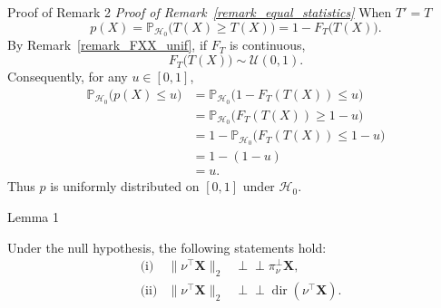 \documentclass{beamer}
\newcommand{\projnu}{\pi_{\nu}^{\perp}}
\newcommand{\indep}{\perp \!\!\! \perp}
\begin{document}
\begin{frame}{Proof of Remark 2}
  \textit{Proof of Remark~\ref{remark_equal_statistics}}
    When \(T'=T\)
    \begin{equation*}
      p(X) = \mathbb{P}_{\mathcal{H}_0}\bigl(T(X) \ge T(X)\bigr)
            = 1 - F_T\bigl(T(X)\bigr).
    \end{equation*}
    By Remark~\ref{remark_FXX_unif}, if \(F_T\) is continuous,
    \begin{equation*}
      F_T\bigl(T(X)\bigr) \sim \mathcal{U}(0,1).
    \end{equation*}
    Consequently, for any \(u\in[0,1]\),
    \begin{align*}
      \mathbb{P}_{\mathcal{H}_0}\bigl(p(X) \le u\bigr)
      &= \mathbb{P}_{\mathcal{H}_0}\bigl(1 - F_T(T(X)) \le u\bigr) \\
      &= \mathbb{P}_{\mathcal{H}_0}\bigl(F_T(T(X)) \ge 1-u\bigr) \\
      &= 1 - \mathbb{P}_{\mathcal{H}_0}\bigl(F_T(T(X)) \le 1-u\bigr) \\
      &= 1 - (1-u) \\
      &= u.
    \end{align*}
    Thus \(p\) is uniformly distributed on \([0,1]\) under \(\mathcal{H}_0\).
\end{frame}

\begin{frame}{Lemma 1}
  \begin{lemma}\label{lemma_indep_add_events}
    Under the null hypothesis, the following statements hold:
    \begin{align*}
      &\text{(i)}  & \|\nu^\top \mathbf{X}\|_2 &\indep \projnu \mathbf{X},\\
      &\text{(ii)} & \|\nu^\top \mathbf{X}\|_2 &\indep \operatorname{dir}(\nu^\top \mathbf{X}).
    \end{align*}
  \end{lemma}
\end{frame}
\end{document}
